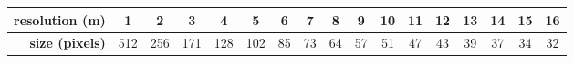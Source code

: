 \begin{tabular}{@{\hskip3pt}r@{\hskip3pt}|@{\hskip3pt}c@{\hskip3pt}@{\hskip3pt}c@{\hskip3pt}@{\hskip3pt}c@{\hskip3pt}@{\hskip3pt}c@{\hskip3pt}@{\hskip3pt}c@{\hskip3pt}@{\hskip3pt}c@{\hskip3pt}@{\hskip3pt}c@{\hskip3pt}@{\hskip3pt}c@{\hskip3pt}@{\hskip3pt}c@{\hskip3pt}@{\hskip3pt}c@{\hskip3pt}@{\hskip3pt}c@{\hskip3pt}@{\hskip3pt}c@{\hskip3pt}@{\hskip3pt}c@{\hskip3pt}@{\hskip3pt}c@{\hskip3pt}@{\hskip3pt}c@{\hskip3pt}@{\hskip3pt}c@{\hskip3pt}}
\textbf{resolution (m)} & 1 & 2 & 3 & 4 & 5 & 6 & 7 & 8 & 9 & 10 & 11 & 12 & 13 & 14 & 15 & 16 \\
\midrule
\textbf{size (pixels)} & 512 & 256 & 171 & 128 & 102 & 85 & 73 & 64 & 57 & 51 & 47 & 43 & 39 & 37 & 34 & 32 \\
\end{tabular}
